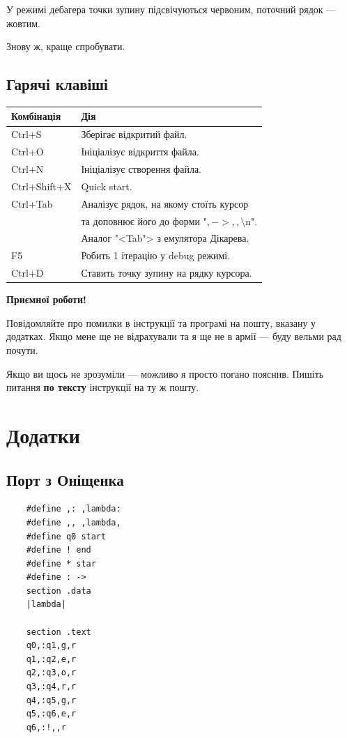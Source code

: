 \documentclass[oneside,final,14pt]{extreport}
\begin{document}
У режимі дебагера точки зупину підсвічуються червоним, поточний рядок --- жовтим.

Знову ж, краще спробувати.
\section{Гарячі клавіші}
\label{sec:hotkeys}
\begin{tabular}{| l | l |}
	\hline
	Комбінація & Дія \\
	\hline
	Ctrl+S & Зберігає відкритий файл. \\
	\hline
	Ctrl+O & Ініціалізує відкриття файла. \\
	\hline
	Ctrl+N & Ініціалізує створення файла. \\
	\hline
	Ctrl+Shift+X & Quick start. \\
	\hline
	Ctrl+Tab & Аналізує рядок, на якому стоїть курсор \\
	 		 &  та доповнює його до форми "$,->,,\setminus$n".\\
			 & Аналог "<Tab"> з емулятора Дікарева.\\
	\hline
	F5 & Робить 1 ітерацію у debug режимі.\\
	\hline
	Ctrl+D & Ставить точку зупину на рядку курсора.\\
	\hline 
\end{tabular}
\bigskip

\textbf{{\large Приємної роботи!}}

Повідомляйте про помилки в інструкції та програмі на пошту, вказану у додатках. Якщо мене ще не відрахували та я ще не в армії --- буду вельми рад почути.

Якщо ви щось не зрозуміли --- можливо я просто погано пояснив. Пишіть питання  {\bfseries по тексту} інструкції на ту ж пошту.

\chapter*{Додатки} 
\section*{Порт з Оніщенка}
\begin{verbatim}
	#define ,: ,lambda:
	#define ,, ,lambda,
	#define q0 start
	#define ! end
	#define * star
	#define : ->
	section .data
	|lambda|

	section .text
	q0,:q1,g,r
	q1,:q2,e,r
	q2,:q3,o,r
	q3,:q4,r,r
	q4,:q5,g,r
	q5,:q6,e,r
	q6,:!,,r
\end{verbatim}
\end{document}
